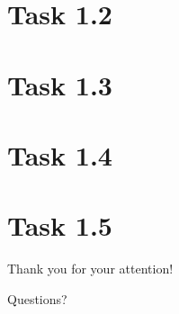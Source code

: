 \documentclass{beamer}
\begin{document}
\section{Task 1.2}
\section{Task 1.3}
\section{Task 1.4}
\section{Task 1.5}

\begin{frame}
\begin{center}
\LARGE
Thank you for your attention!
\begin{center}
\LARGE
Questions?
\end{center}
\end{center}
\end{frame}



%
%

\end{document}
